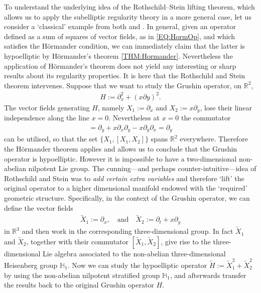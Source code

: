 \documentclass[12pt,oneside,a4paper]{book}
\numberwithin{equation}{section}     %
\theoremstyle{plain}
\theoremstyle{definition}
\newcommand{\R}{{\mathbb R}}
\begin{document}
To understand the underlying idea of the Rothschild--Stein lifting theorem, which allows us to apply the subelliptic regularity theory in a more general case, let us consider a `classical' example from both \cite{Rothschild-Stein:AM-1976} and \cite{F1977}. In general, given an operator defined as a sum of squares of vector fields, as in \eqref{EQ:HormOp}, and which satisfies the H\"ormander condition, we can immediately claim that the latter is hypoelliptic by H\"ormander's theorem \ref{THM:Hormander}. Nevertheless the application of H\"ormander's theorem does not yield any interesting or sharp results about its regularity properties. It is here that the Rothschild and Stein theorem intervenes. Suppose that we want to study the Grushin operator, on $\R^2$,
\begin{align*}
H:=\partial_x^2+(x\partial y)^2.
\end{align*}
The vector fields generating $H$, namely $X_1:=\partial_x$ and $X_2:=x\partial_y$, lose their linear independence along the line $x=0$.  Nevertheless at $x=0$ the commutator  
\begin{align*}
[X_1,X_2]=\partial_y+x\partial_x\partial_y-x\partial_y\partial_x=\partial_y
\end{align*}
can be utilised, so that the set $\{X_1,[X_1,X_2]\}$ spans $\R^2$ everywhere. Therefore the H\"ormander theorem applies and allows us to conclude that the Grushin operator is hypoelliptic. However it is impossible to have a two-dimensional non-abelian nilpotent Lie group. The cunning---and perhaps counter-intuitive---idea of Rothschild and Stein was to \textit{add certain extra variables} and therefore `lift' the original operator to a higher dimensional manifold endowed with the `required' geometric structure. Specifically, in the context of the Grushin operator, we can define the vector fields
\begin{align*}
\tilde{X}_1:=\partial_x,\quad\text{and}\quad\tilde{X}_2:=\partial_t+x\partial_y
\end{align*}
in $\R^3$ and then work in the corresponding three-dimensional group. In fact $\tilde{X}_1$ and $\tilde{X}_2$, together with their commutator $[\tilde{X}_1,\tilde{X}_2]$, give rise to the three-dimensional Lie algebra associated to the non-abelian three-dimensional Heisenberg group $\mathbb{H}_1$. Now we can study the hypoelliptic operator $\tilde{H}:=\tilde{X}_1^2+ \tilde{X}_2^2$ by using the non-abelian nilpotent stratified group $\mathbb{H}_1$, and afterwards transfer the results back to the original Grushin operator $H$.
\end{document}
